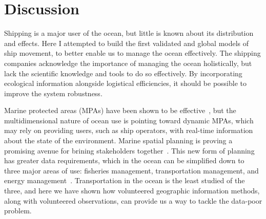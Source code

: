 \section{Discussion}


Shipping is a major user of the ocean, but little is known about its distribution and effects. Here I attempted to build the first validated and global models of ship movement, to better enable us to manage the ocean effectively. The shipping companies acknowledge the importance of managing the ocean holistically, but lack the scientific knowledge and tools to do so effectively. By incorporating ecological information alongside logistical efficiencies, it should be possible to improve the system robustness.

Marine protected areas (MPAs) have been shown to be effective~\citep{halpern2002marine}, but the multidimensional nature of ocean use is pointing toward dynamic MPAs, which may rely on providing users, such as ship operators, with real-time information about the state of the environment. Marine spatial planning is proving a promising avenue for brining stakeholders together~\citep{merrifield2012marinemap}. This new form of planning has greater data requirements, which in the ocean can be simplified down to three major areas of use: fisheries management, transportation management, and energy management~\citep{Lubchenco2010}. Transportation in the ocean is the least studied of the three, and here we have shown how volunteered geographic information methods, along with volunteered observations, can provide us a way to tackle the data-poor problem.







